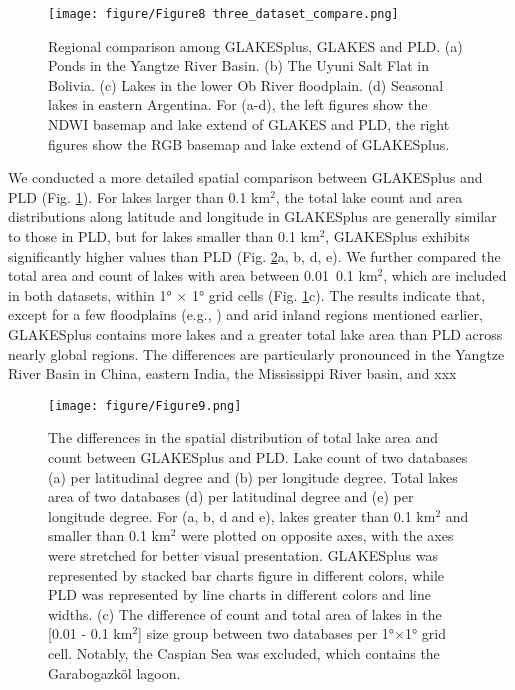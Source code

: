 \documentclass[preprint,12pt,authoryear]{elsarticle}
\begin{document}
\begin{figure}[h]
    \centering
    \texttt{[image: figure/Figure8 three\_dataset\_compare.png]}
    \caption{Regional comparison among GLAKESplus, GLAKES and PLD. (a) Ponds in the Yangtze River Basin. (b) The Uyuni Salt Flat in Bolivia. (c) Lakes in the lower Ob River floodplain. (d) Seasonal lakes in eastern Argentina. For (a-d), the left figures show the NDWI basemap and lake extend of GLAKES and PLD, the right figures show the RGB basemap and lake extend of GLAKESplus.}
    \label{fig:Fig8}
\end{figure}

We conducted a more detailed spatial comparison between GLAKESplus and PLD (Fig. \ref{fig:Fig8}). For lakes larger than 0.1 km$^2$, the total lake count and area distributions along latitude and longitude in GLAKESplus are generally similar to those in PLD, but for lakes smaller than 0.1 km$^2$, GLAKESplus exhibits significantly higher values than PLD (Fig. \ref{fig:Fig9}a, b, d, e). We further compared the total area and count of lakes with area between 0.01~0.1 km$^2$, which are included in both datasets, within 1° × 1° grid cells (Fig. \ref{fig:Fig8}c). The results indicate that, except for a few floodplains (e.g., ) and arid inland regions mentioned earlier, GLAKESplus contains more lakes and a greater total lake area than PLD across nearly global regions. The differences are particularly pronounced in the Yangtze River Basin in China, eastern India, the Mississippi River basin, and xxx 

\begin{figure}[t]
    \centering
    \texttt{[image: figure/Figure9.png]}
    \caption{The differences in the spatial distribution of total lake area and count between GLAKESplus and PLD. Lake count of two databases (a) per latitudinal degree and (b) per longitude degree. Total lakes area of two databases (d) per latitudinal degree and (e) per longitude degree. For (a, b, d and e), lakes greater than 0.1 km$^2$ and smaller than 0.1 km$^2$ were plotted on opposite axes, with the axes were stretched for better visual presentation. GLAKESplus was represented by stacked bar charts figure in different colors, while PLD was represented by line charts in different colors and line widths. (c) The difference of count and total area of lakes in the [0.01 - 0.1 km$^2$] size group between two databases per 1°×1° grid cell. Notably, the Caspian Sea was excluded, which contains the Garabogazköl lagoon.}
    \label{fig:Fig9}
\end{figure}
\end{document}
